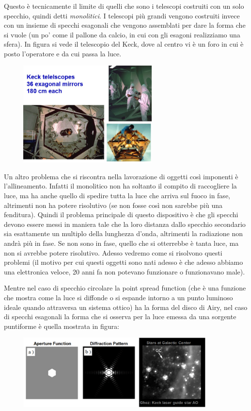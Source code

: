 Questo è tecnicamente il limite di quelli che sono i telescopi costruiti con un solo specchio, quindi detti \textit{monolitici}. I telescopi più grandi vengono costruiti invece con un insieme di specchi esagonali che vengono assemblati per dare la forma che si vuole (un po' come il pallone da calcio, in cui con gli esagoni realizziamo una sfera). In figura si vede il telescopio del Keck, dove al centro vi è un foro in cui è posto l'operatore e da cui passa la luce.

\begin{figure}[H]
        \centering
        \includegraphics[width=7cm]{7.jpg}
\end{figure}

Un altro problema che si riscontra nella lavorazione di oggetti così imponenti è l'allineamento. Infatti il monolitico non ha soltanto il compito di raccogliere la luce, ma ha anche quello di spedire tutta la luce che arriva sul fuoco in fase, altrimenti non ha potere risolutivo (se non fosse così non sarebbe più una fenditura). Quindi il problema principale di questo dispositivo è che gli specchi devono essere messi in maniera tale che la loro distanza dallo specchio secondario sia esattamente un multiplo della lunghezza d'onda, altrimenti la radiazione non andrà più in fase. Se non sono in fase, quello che si otterrebbe è tanta luce, ma non si avrebbe potere risolutivo. Adesso vedremo come si risolvono questi problemi (il motivo per cui questi oggetti sono nati adesso è che adesso abbiamo una elettronica veloce, 20 anni fa non potevano funzionare o funzionavano male).

Mentre nel caso di specchio circolare la point spread function (che è una funzione che mostra come la luce si diffonde o si espande intorno a un punto luminoso ideale quando attraversa un sistema ottico) ha la forma del disco di Airy, nel caso di specchi esagonali la forma che si osserva per la luce emessa da una sorgente puntiforme è quella mostrata in figura:

\begin{figure}[H]
    \centering
    \includegraphics[width=10cm]{immagini/immagine_specchi_esagonali.png}
\end{figure}

